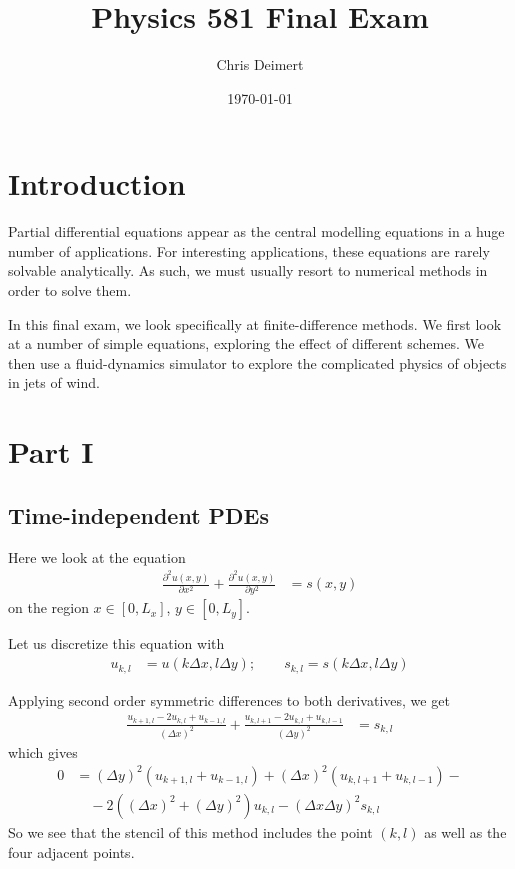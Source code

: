 \documentclass[twocolumn]{myarticle}
\numberwithin{equation}{section}
\begin{document}
\title{Physics 581 Final Exam}
\author{Chris Deimert}
\date{\today}

\maketitle

\section{Introduction}
\label{sec:introduction}

Partial differential equations appear as the central modelling equations in a huge number of applications.
For interesting applications, these equations are rarely solvable analytically.
As such, we must usually resort to numerical methods in order to solve them.

In this final exam, we look specifically at finite-difference methods.
We first look at a number of simple equations, exploring the effect of different schemes.
We then use a fluid-dynamics simulator to explore the complicated physics of objects in jets of wind.

\section{Part I}
\label{sec:part_i}

\subsection{Time-independent PDEs}
\label{subsec:time_independent_pdes}

Here we look at the equation
\begin{align}
    \frac{\partial^2 u(x,y)}{\partial x^2} + \frac{\partial^2 u(x,y)}{\partial y^2} &= s(x,y) \label{eq:poisson_equation}
\end{align}
on the region $ x \in [0, L_x] $, $ y \in [0, L_y] $.

Let us discretize this equation with
\begin{align}
    u_{k,l} &= u\left(k \Delta x, l \Delta y\right); \qquad s_{k,l} = s\left(k \Delta x, l \Delta y\right)
\end{align}

Applying second order symmetric differences to both derivatives, we get
\begin{align}
    \frac{u_{k+1, l} - 2 u_{k,l} + u_{k-1,l}}{\left( \Delta x \right)^2} + \frac{u_{k,l+1} - 2 u_{k,l} + u_{k,l-1}}{\left( \Delta y \right)^2} &= s_{k,l}
\end{align}
which gives
\begin{align}
    0 &= \left( \Delta y \right)^2 \left( u_{k+1, l} + u_{k-1,l} \right) + \left( \Delta x \right)^2 \left( u_{k,l+1} + u_{k,l-1} \right) - \nonumber
    \\
    & \quad - 2 \left( \left( \Delta x \right)^2 + \left( \Delta y \right)^2 \right) u_{k,l} - \left( \Delta x \Delta y \right)^2 s_{k,l}
\end{align}
So we see that the stencil of this method includes the point $ (k,l) $ as well as the four adjacent points.
\end{document}
